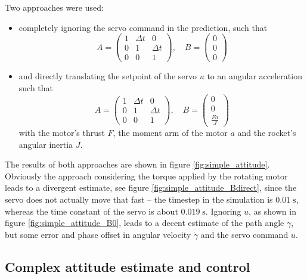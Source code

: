 \documentclass[a4paper]{article}
\renewcommand{\u}[1]{\;\mathrm{#1}}
\begin{document}
Two approaches were used: \begin{itemize}
\item completely ignoring the servo command in the prediction, such that \begin{equation}A = \begin{pmatrix}1 & \Delta t & 0 \\ 0 & 1 & \Delta t \\ 0 & 0 & 1\end{pmatrix}, \quad B = \begin{pmatrix}0 \\ 0 \\ 0\end{pmatrix}\end{equation}
\item and directly translating the setpoint of the servo $u$ to an angular acceleration such that \begin{equation}A = \begin{pmatrix}1 & \Delta t & 0 \\ 0 & 1 & \Delta t \\ 0 & 0 & 1\end{pmatrix}, \quad B = \begin{pmatrix}0 \\ 0 \\ \frac{Fa}{J}\end{pmatrix}\end{equation}with the motor's thrust $F$, the moment arm of the motor $a$ and the rocket's angular inertia $J$.\end{itemize}
The results of both approaches are shown in figure \ref{fig:simple_attitude}. Obviously the approach considering the torque applied by the rotating motor leads to a divergent estimate, see figure \ref{fig:simple_attitude_Bdirect}, since the servo does not actually move that fast -- the timestep in the simulation is $0.01\u{s}$, whereas the time constant of the servo is about $0.019\u{s}$. Ignoring $u$, as shown in figure \ref{fig:simple_attitude_B0}, leads to a decent estimate of the path angle $\gamma$, but some error and phase offset in angular velocity $\dot{\gamma}$ and the servo command $u$.

\subsection{Complex attitude estimate and control}
\end{document}
